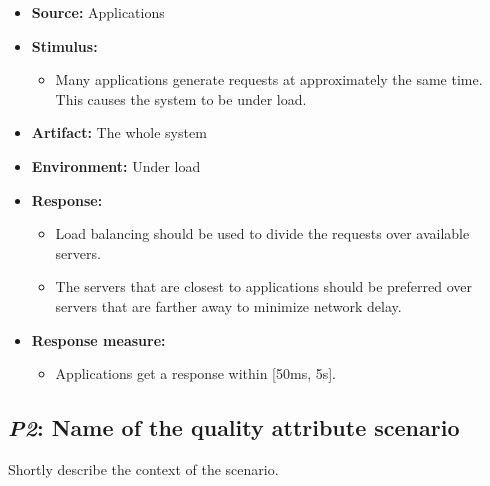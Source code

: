 \documentclass[english]{sareport}
\begin{document}
\begin{itemize}
    \item \textbf{Source:} Applications
    \item \textbf{Stimulus:}
        \begin{itemize}
            \item Many applications generate requests at approximately the same time.
                  This causes the system to be under load.
        \end{itemize}

    \item \textbf{Artifact:} The whole system
    \item \textbf{Environment:} Under load
    \item \textbf{Response:}
        \begin{itemize}
            \item Load balancing should be used to divide the requests over
                  available servers.
            \item The servers that are closest to applications should be preferred
                  over servers that are farther away to minimize network delay.
        \end{itemize}

    \item \textbf{Response measure:}
        \begin{itemize}
            \item Applications get a response within [50ms, 5s].
        \end{itemize}
\end{itemize}

\subsection{\emph{P2}: Name of the quality attribute scenario}
Shortly describe the context of the scenario.
\end{document}
